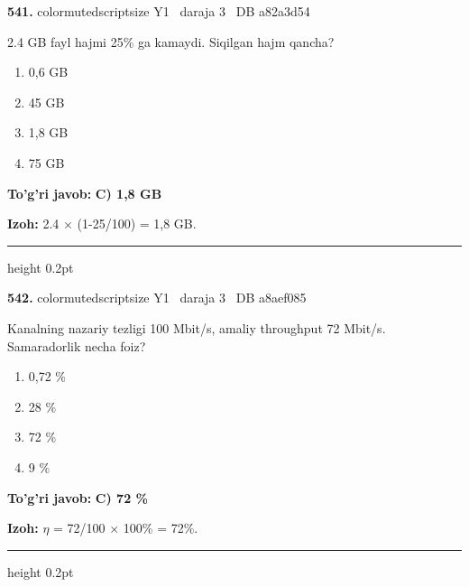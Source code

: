 \documentclass[10pt,a4paper,oneside]{article}
\begin{document}
\noindent\textbf{\color{ink}541.}  {color{muted}scriptsize Y1 \textbullet\ daraja 3 \textbullet\ DB a82a3d54}
\par
2.4 GB fayl hajmi 25\% ga kamaydi. Siqilgan hajm qancha?
\begin{enumerate}[label=\Alph*),leftmargin=9mm]
\item 0,6 GB
\item 45 GB
\item 1,8 GB
\item 75 GB
\end{enumerate}
\begin{tcolorbox}[enhanced,breakable,colback=teal!4,colframe=teal!50!black,boxrule=0.5pt,arc=1.1mm,left=3mm,right=3mm,top=1.7mm,bottom=1.7mm,before skip=2mm,after skip=2mm]
\textbf{\color{teal}To'g'ri javob:} \textbf{C) 1,8 GB}
\par\smallskip
\textbf{Izoh:} 2.4 \ensuremath{\times} (1-25/100) = 1,8 GB.
\end{tcolorbox}
\vspace{2mm}\hrule height 0.2pt \vspace{3mm}

\noindent\textbf{\color{ink}542.}  {color{muted}scriptsize Y1 \textbullet\ daraja 3 \textbullet\ DB a8aef085}
\par
Kanalning nazariy tezligi 100 Mbit/s, amaliy throughput 72 Mbit/s. Samaradorlik necha foiz?
\begin{enumerate}[label=\Alph*),leftmargin=9mm]
\item 0,72 \%
\item 28 \%
\item 72 \%
\item 9 \%
\end{enumerate}
\begin{tcolorbox}[enhanced,breakable,colback=teal!4,colframe=teal!50!black,boxrule=0.5pt,arc=1.1mm,left=3mm,right=3mm,top=1.7mm,bottom=1.7mm,before skip=2mm,after skip=2mm]
\textbf{\color{teal}To'g'ri javob:} \textbf{C) 72 \%}
\par\smallskip
\textbf{Izoh:} \ensuremath{\eta} = 72/100 \ensuremath{\times} 100\% = 72\%.
\end{tcolorbox}
\vspace{2mm}\hrule height 0.2pt \vspace{3mm}
\end{document}
